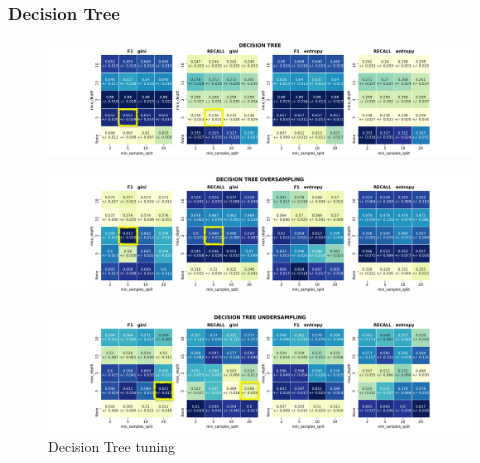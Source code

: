 \documentclass{article}
\begin{document}
	
	\subsubsection{Decision Tree}
	\begin{figure}[H]
		\centering
		\includegraphics[width=\textwidth]{clf_img/DecisionTree.png}
	\end{figure}
	\begin{figure}[H]
		\centering
		\includegraphics[width=\textwidth]{clf_img/DecisionTree_OS.png}
	\end{figure}
	\begin{figure}[H]
		\centering
		\includegraphics[width=\textwidth]{clf_img/DecisionTree_US.png}
		\caption{Decision Tree tuning}
		\label{fig:hyper_dectree}
	\end{figure}
	
\end{document}
